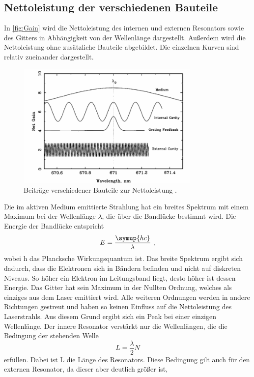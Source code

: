 \subsection{Nettoleistung der verschiedenen Bauteile}
In \autoref{fig:Gain} wird die Nettoleistung des internen und externen Resonators sowie des Gitters in Abhängigkeit von der Wellenlänge dargestellt. 
Außerdem wird die Nettoleistung ohne zusätzliche Bauteile abgebildet. Die einzelnen Kurven sind relativ zueinander dargestellt.
\begin{figure}
    \centering
    \includegraphics[width=0.8\textwidth]{NetGain.png}
    \caption{Beiträge verschiedener Bauteile zur Nettoleistung \cite{ap60}.}
    \label{fig:Gain}
\end{figure}
Die im aktiven Medium emittierte Strahlung hat ein breites Spektrum mit einem Maximum bei der Wellenlänge 
$\lambda$, die über die Bandlücke bestimmt wird. Die Energie der Bandlücke entspricht 
\begin{equation*}
    E = \frac{\symup{hc}}{\lambda} \, \, ,
\end{equation*}
wobei h das Plancksche Wirkungsquantum ist. Das breite Spektrum ergibt sich dadurch, dass die Elektronen sich in Bändern
befinden und nicht auf diskreten Niveaus. So höher ein Elektron im Leitungsband liegt, desto höher ist dessen Energie.
Das Gitter hat sein Maximum in der Nullten Ordnung, welches als einziges aus dem Laser emittiert wird. Alle weiteren Ordnungen werden
in andere Richtungen gestreut und haben so keinen Einfluss auf die Nettoleistung des Laserstrahls. 
Aus diesem Grund ergibt sich ein Peak bei einer einzigen Wellenlänge.
Der innere Resonator verstärkt nur die Wellenlängen, die die Bedingung der stehenden Welle 
\begin{equation*}
    L = \frac{\lambda}{2}N
\end{equation*}
erfüllen. Dabei ist L die Länge des Resonators. Diese Bedingung gilt auch für den externen Resonator, da dieser aber deutlich größer ist, 

